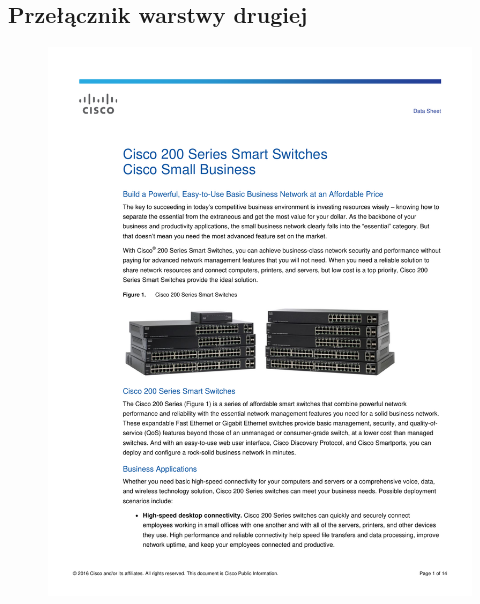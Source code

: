 \documentclass[a4paper, 12pt]{article}
\begin{document}
\subsection{Przełącznik warstwy drugiej}
\begin{figure}[H]
\centering
    \includegraphics[scale=0.80]{spec/sw2.pdf}
    \label{fig:PropProf}
\end{figure}
\end{document}
